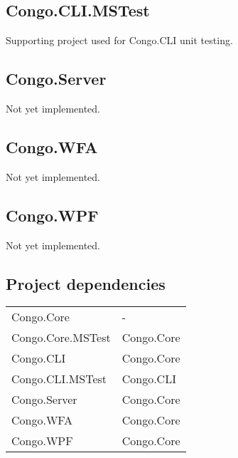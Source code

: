 \subsection{Congo.CLI.MSTest}

Supporting project used for \textsf{Congo.CLI} unit testing.

\subsection{Congo.Server}

Not yet implemented.

\subsection{Congo.WFA}

Not yet implemented.

\subsection{Congo.WPF}

Not yet implemented.

\subsection{Project dependencies}

\begin{center}
\begin{tabular}{ l | l }
Congo.Core        & -          \\
Congo.Core.MSTest & Congo.Core \\
Congo.CLI         & Congo.Core \\
Congo.CLI.MSTest  & Congo.CLI  \\
Congo.Server      & Congo.Core \\
Congo.WFA         & Congo.Core \\
Congo.WPF         & Congo.Core
\end{tabular}
\end{center}
